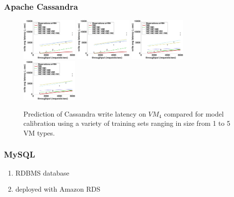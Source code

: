 \documentclass{beamer}
\begin{document}
\begin{frame}
\frametitle{Apache Cassandra}
\begin{figure}
\includegraphics[width=0.25\textwidth]{cassandra_fit_write_avg_latency_m3_2x_m3__r3_2x_m3_x_r3_x_r3_.eps}
\includegraphics[width=0.25\textwidth]{cassandra_fit_write_avg_latency_m3_2x_m3__r3_2x_r3_x_m3_x_r3_.eps}
\includegraphics[width=0.25\textwidth]{cassandra_fit_write_avg_latency_m3_x_m3_2x_r3_2x_m3__r3_x_r3_.eps}
\includegraphics[width=0.25\textwidth]{cassandra_fit_write_avg_latency_m3_x_m3_2x_r3_2x_r3_x_m3__r3_.eps}
\caption{Prediction of Cassandra write latency on $VM_4$ compared for model calibration using a variety of training sets ranging in size from 1 to 5 VM types.}
\end{figure}
\end{frame}

\begin{frame}
\frametitle{MySQL}
\begin{enumerate}
\item RDBMS database
\item deployed with Amazon RDS
\end{enumerate}
\end{frame}
\end{document}
